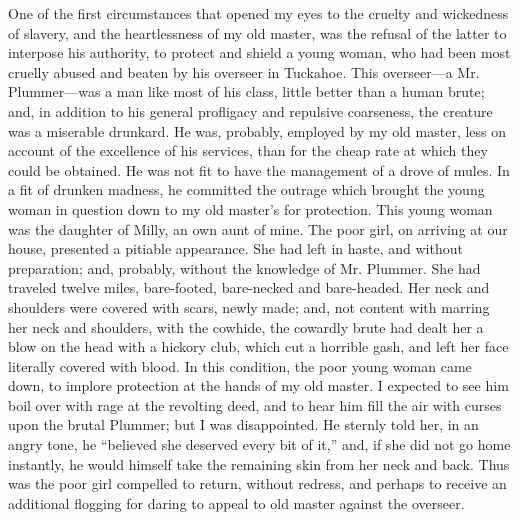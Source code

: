 One of the first circumstances that opened my eyes to the cruelty and
wickedness of slavery, and the heartlessness of my old master, was the
refusal of the latter to interpose his authority, to protect and shield
a young woman, who had been most cruelly abused and beaten by his
overseer in Tuckahoe. This overseer---a Mr. Plummer---was a man like
most of his class, little better than a human brute; and, in addition to
his general profligacy and repulsive coarseness, the creature was a
miserable drunkard. He was, probably, employed by my old master, less on
account of the excellence of his services, than for the cheap rate at
which they could be obtained. He was not fit to have the management of a
drove of mules. In a fit of drunken madness, he committed the outrage
which brought the young woman in question down to my old master's for
protection. This young woman was the daughter of Milly, an own aunt of
mine. The poor girl, on arriving at our house, presented a pitiable
appearance. She had left in haste, and without preparation; and,
probably, without the knowledge of Mr. Plummer. She had traveled twelve
miles, bare-footed, bare-necked and bare-headed. Her neck and shoulders
were covered with scars, newly made; and, not content with marring her
neck and shoulders, with the cowhide, the cowardly brute had dealt her a
blow on the head with a hickory club, which cut a horrible gash, and
left her face literally covered with blood. In this condition, the poor
young woman came down, to implore protection at {}the hands of my old
master. I expected to see him boil over with rage at the revolting deed,
and to hear him fill the air with curses upon the brutal Plummer; but I
was disappointed. He sternly told her, in an angry tone, he ``believed
she deserved every bit of it,'' and, if she did not go home instantly,
he would himself take the remaining skin from her neck and back. Thus
was the poor girl compelled to return, without redress, and perhaps to
receive an additional flogging for daring to appeal to old master
against the overseer.

